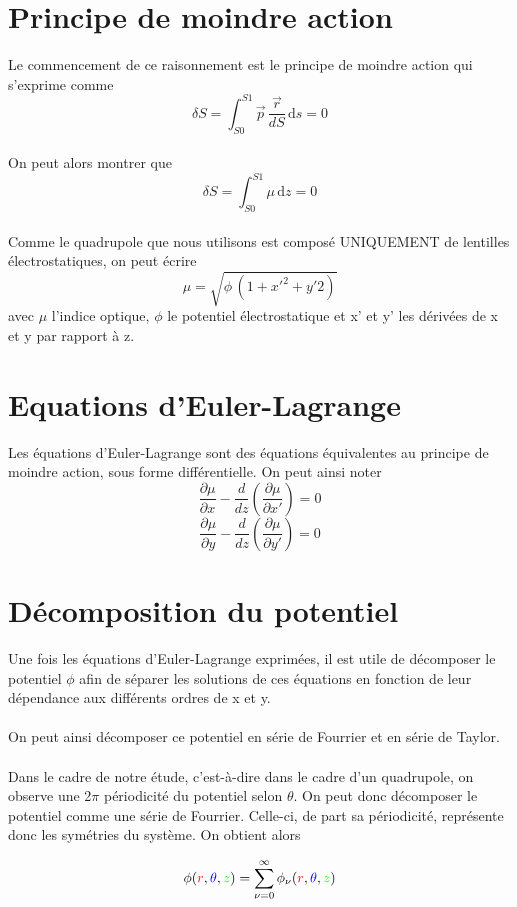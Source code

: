 \documentclass{report}
\begin{document}
\section{Principe de moindre action}
Le commencement de ce raisonnement est le principe de moindre action qui s'exprime comme 
\[
\delta S = \int_{S0}^{S1} \vec{p}\,\frac{\vec{r}}{dS} \, \mathrm{d}s = 0
\]
\\
On peut alors montrer que 
\[
\delta S = \int_{S0}^{S1} \mu\,\mathrm{d}z = 0
\]
\\
Comme le quadrupole que nous utilisons est composé UNIQUEMENT de lentilles électrostatiques, on peut écrire
\[
\mu = \sqrt{\phi \, (1+x'^2+y'2)}
\]
avec $\mu$ l'indice optique, $\phi$ le potentiel électrostatique et x' et y' les dérivées de x et y par
rapport à z.

\section{Equations d'Euler-Lagrange}
Les équations d'Euler-Lagrange sont des équations équivalentes au principe de moindre action, sous forme 
différentielle. On peut ainsi noter 
\[
\frac{\partial \mu }{\partial x}-\frac{d}{dz}\left(\frac{\partial \mu }{\partial x'}\right)=0
\]
\[
\frac{\partial \mu }{\partial y}-\frac{d}{dz}\left(\frac{\partial \mu }{\partial y'}\right)=0
\]

\section{Décomposition du potentiel}
Une fois les équations d'Euler-Lagrange exprimées, il est utile de décomposer le potentiel $\phi$ afin de 
séparer les solutions de ces équations en fonction de leur dépendance aux différents ordres de x et y. 
\\
\\
On peut ainsi décomposer ce potentiel en série de Fourrier et en série de Taylor. 
\\
\\
Dans le cadre de notre étude, c'est-à-dire dans le cadre d'un quadrupole, on observe une 2$\pi$ périodicité 
du potentiel selon $\theta$.
On peut donc décomposer le potentiel comme une série de Fourrier. Celle-ci, de part sa périodicité, représente 
donc les symétries du système. On obtient alors 

\[
\phi ({\color{red}r},{\color{blue}\theta},{\color{green}z})=\sum\limits_{\nu =0}^{\infty} \phi_\nu ({\color{red}r},{\color{blue}\theta},{\color{green}z})
\]
\end{document}
